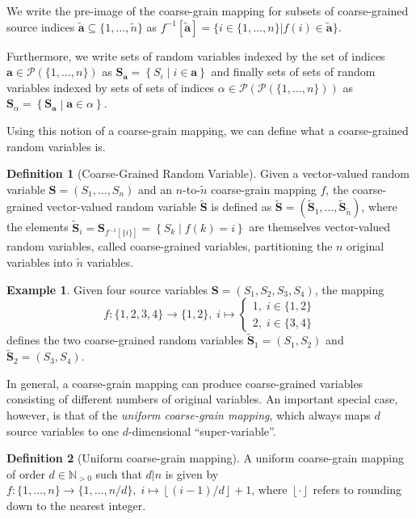 \documentclass[10pt]{article}
\theoremstyle{definition}
\newtheorem{definition}{Definition}[section]
\newtheorem{example}{Example}[section]
\theoremstyle{plain}
\begin{document}
We write the pre-image of the coarse-grain mapping for subsets of coarse-grained source indices $\bm{\tilde{a}} \subseteq \{1, \dots, \tilde{n}\}$ as $f^{-1}[\bm{\tilde{a}}] = \{i \in \{1, \dots, n\} | f(i) \in \bm{\tilde{a}}\}$.

Furthermore, we write sets of random variables indexed by the set of indices $\bm{a} \in \mathcal{P}(\{1, \dots, n\})$ as $\bm{S}_{\bm{a}} = \left\{S_i \middle| i \in \bm{a} \right\}$ and finally sets of sets of random variables indexed by sets of sets of indices $\alpha \in \mathcal{P}(\mathcal{P}(\{1, \dots, n\}))$ as $\bm{S}_\alpha = \left\{\bm{S}_{\bm{a}} \middle| \bm{a} \in \alpha \right\}$.

Using this notion of a coarse-grain mapping, we can define what a coarse-grained random variables is.

\begin{definition}[Coarse-Grained Random Variable]
Given a vector-valued random variable $\bm{S} = \left(S_1, \dots, S_n\right)$ and an $n$-to-$\tilde n$ coarse-grain mapping $f$, the coarse-grained vector-valued random variable $\bm{\tilde S}$ is defined as $\bm{\tilde{S}} = (\bm{\tilde{S}}_1, \dots, \bm{\tilde{S}}_{\tilde n})$, where the elements $\bm{\tilde{S}}_i = \bm S_{f^{-1}[\{i\}]} = \left\{S_k \middle| f(k) = i\right\}$ are themselves vector-valued random variables, called coarse-grained variables, partitioning the $n$ original variables into $\tilde n$ variables. 
\end{definition}
\begin{example} Given four source variables $\bm{S} = (S_1, S_2, S_3, S_4)$, the mapping $$f:\{1, 2, 3, 4\}\to\{1, 2\},\; i \mapsto \begin{cases} 1,\; i\in\{1, 2\}\\2,\; i\in\{3, 4\}\end{cases} $$ defines the two coarse-grained random variables $\bm{\tilde{S}}_1 = (S_1, S_2)$ and $\bm{\tilde{S}}_2 = (S_3, S_4)$.
\end{example}
In general, a coarse-grain mapping can produce coarse-grained variables consisting of different numbers of original variables. An important special case, however, is that of the \textit{uniform coarse-grain mapping}, which always maps $d$ source variables to one $d$-dimensional ``super-variable''.

\begin{definition}[Uniform coarse-grain mapping]
A uniform coarse-grain mapping of order $d \in \mathbb{N}_{>0}$ such that $d|n$ is given by $f:\{1, \dots, n\} \to \{1, \dots, n/d\}, \; i \mapsto \left\lfloor (i-1)/d \right\rfloor + 1$, where $\left\lfloor \cdot \right\rfloor$ refers to rounding down to the nearest integer.
\end{definition}
\end{document}
